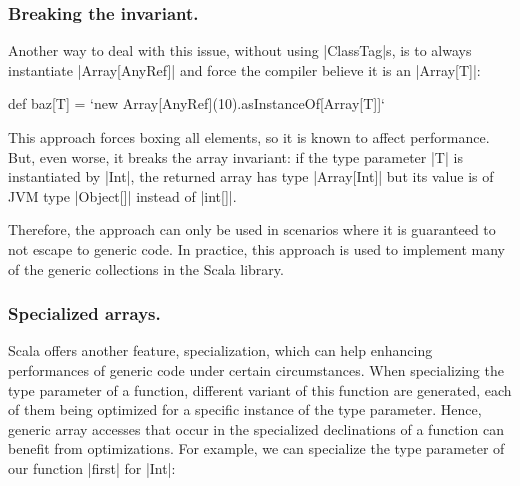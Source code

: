 \subsubsection{Breaking the invariant.} Another way to deal with this issue, without using |ClassTag|s, is to always instantiate |Array[AnyRef]| and force the compiler believe it is an |Array[T]|:

\begin{lstlisting-nobreak}
 def baz[T] = `new Array[AnyRef](10).asInstanceOf[Array[T]]`
\end{lstlisting-nobreak}

This approach forces boxing all elements, so it is known to affect performance. But, even worse, it breaks the array invariant: if the type parameter |T| is instantiated by |Int|, the returned array has type |Array[Int]| but its value is of JVM type |Object[]| instead of |int[]|.

Therefore, the approach can only be used in scenarios where it is guaranteed to not escape to generic code. In practice, this approach is used to implement many of the generic collections in the Scala library.

%



\subsubsection{Specialized arrays.}

Scala offers another feature, specialization, which can help enhancing performances of generic code under certain circumstances. When specializing the type parameter of a function, different variant of this function are generated, each of them being optimized for a specific instance of the type parameter. Hence, generic array accesses that occur in the specialized declinations of a function can benefit from optimizations. For example, we can specialize the type parameter of our function |first| for |Int|: 

